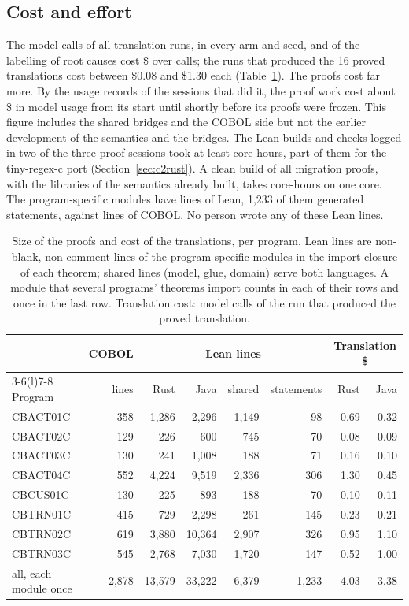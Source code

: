 \subsection{Cost and effort}
\label{sec:effort}

The model calls of all translation runs, in every arm and seed, and of the labelling of root causes cost
\$\aTranslUsd{} over \aTranslCalls{} calls; the runs that produced the 16 proved translations cost between \$0.08 and
\$1.30 each (Table~\ref{tab:effort}). The proofs cost far more. By the usage records of the sessions that did it, the proof work cost about \$\eAllInUsd{} in model usage from its
start until shortly before its proofs were frozen. This figure includes the shared bridges and the COBOL side but not
the earlier development of the semantics and the bridges. The Lean builds and checks logged in two of the three proof
sessions took at least \eCoreHMeasured{} core-hours, part of them for the tiny-regex-c port
(Section~\ref{sec:c2rust}). A clean build of all migration proofs,
with the libraries of the semantics already built, takes \eCleanCoreH{} core-hours on one core. The program-specific
modules have \eProofLines{} lines of Lean, 1,233 of them generated statements, against \aCobolLines{} lines of COBOL. No person wrote any of these Lean lines.

\begin{table}
\caption{Size of the proofs and cost of the translations, per program. Lean lines are non-blank, non-comment lines of
the program-specific modules in the import closure of each theorem; shared lines (model, glue, domain) serve both
languages. A module that several programs' theorems import counts in each of their rows and once in the last row. Translation cost: model calls of the run that produced the proved translation.}
\label{tab:effort}
\footnotesize
\begin{tabular}{@{}lrrrrrrr@{}}
\toprule
 & COBOL & \multicolumn{4}{c}{Lean lines} & \multicolumn{2}{c}{Translation \$} \\
\cmidrule(lr){3-6}\cmidrule(l){7-8}
Program & lines & Rust & Java & shared & statements & Rust & Java \\
\midrule
CBACT01C & 358 & 1,286 & 2,296 & 1,149 & 98 & 0.69 & 0.32 \\
CBACT02C & 129 & 226 & 600 & 745 & 70 & 0.08 & 0.09 \\
CBACT03C & 130 & 241 & 1,008 & 188 & 71 & 0.16 & 0.10 \\
CBACT04C & 552 & 4,224 & 9,519 & 2,336 & 306 & 1.30 & 0.45 \\
CBCUS01C & 130 & 225 & 893 & 188 & 70 & 0.10 & 0.11 \\
CBTRN01C & 415 & 729 & 2,298 & 261 & 145 & 0.23 & 0.21 \\
CBTRN02C & 619 & 3,880 & 10,364 & 2,907 & 326 & 0.95 & 1.10 \\
CBTRN03C & 545 & 2,768 & 7,030 & 1,720 & 147 & 0.52 & 1.00 \\
\midrule
all, each module once & 2,878 & 13,579 & 33,222 & 6,379 & 1,233 & 4.03 & 3.38 \\
\bottomrule
\end{tabular}
\end{table}
